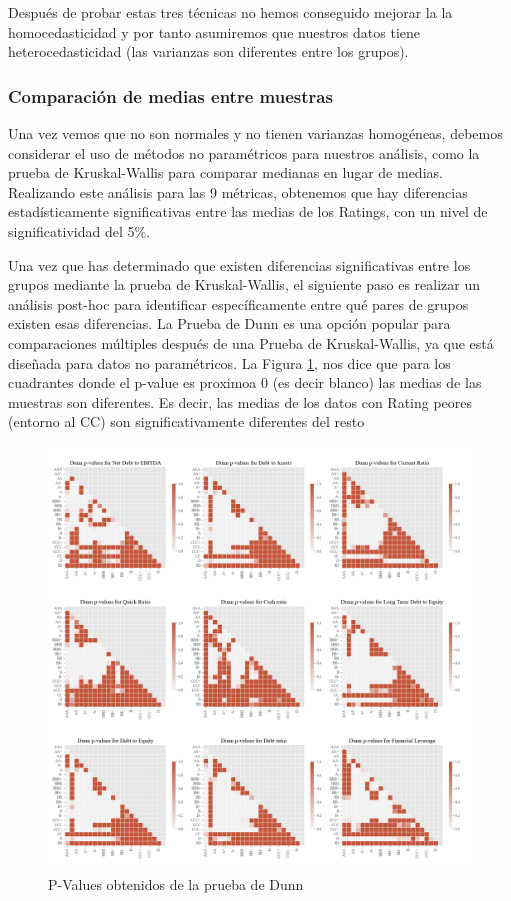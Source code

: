 \documentclass{article}
\begin{document}
\noindent Después de probar estas tres técnicas no hemos conseguido mejorar la la homocedasticidad y por tanto asumiremos que nuestros datos tiene heterocedasticidad (las varianzas son diferentes entre los grupos).

\subsubsection{Comparación de medias entre muestras}
Una vez vemos que no son normales y no tienen varianzas homogéneas, debemos considerar el uso de métodos no paramétricos para nuestros análisis, como la prueba de Kruskal-Wallis para comparar medianas en lugar de medias. Realizando este análisis para las 9 métricas, obtenemos que hay diferencias estadísticamente significativas entre las medias de los Ratings, con un nivel de significatividad del 5\%.

Una vez que has determinado que existen diferencias significativas entre los grupos mediante la prueba de Kruskal-Wallis, el siguiente paso es realizar un análisis post-hoc para identificar específicamente entre qué pares de grupos existen esas diferencias. La Prueba de Dunn es una opción popular para comparaciones múltiples después de una Prueba de Kruskal-Wallis, ya que está diseñada para datos no paramétricos. La Figura \ref{fig:dunn_pvalues}, nos dice que para los cuadrantes donde el p-value es proximoa 0 (es decir blanco) las medias de las muestras son diferentes. Es decir, las medias de los datos con Rating peores (entorno al CC) son significativamente diferentes del resto

\begin{figure}
\centering
\includegraphics[width=1\textwidth]{dunn_pvalues.png}
\caption{P-Values obtenidos de la prueba de Dunn}
\label{fig:dunn_pvalues}
\end{figure}
\end{document}
